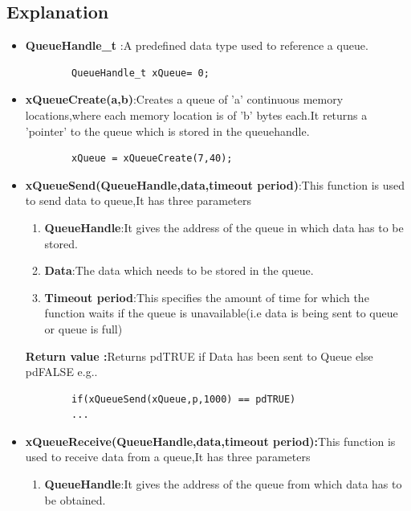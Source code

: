 \documentclass[11pt,a4paper]{article}
\begin{document}
	\subsection{Explanation}
	\begin{itemize}
		\item \textbf{QueueHandle\_t} :A predefined data type used to reference a queue.
		
		\begin{lstlisting}
		QueueHandle_t xQueue= 0;
		\end{lstlisting}	
		
		\item \textbf{xQueueCreate(a,b)}:Creates a queue of 'a' continuous memory locations,where each memory location is of 'b' bytes each.It returns a 'pointer' to the queue which is stored in the queuehandle.
		
		\begin{lstlisting}
		xQueue = xQueueCreate(7,40);
		\end{lstlisting}
		
		\item \textbf{xQueueSend(QueueHandle,data,timeout period)}:This function is used to send data to queue,It has three parameters
		
		\begin{enumerate}
			\item\textbf{QueueHandle}:It gives the address of the queue in which data has to be stored.
			
			\item\textbf{Data}:The data which needs to be stored in the queue.
			
			\item\textbf{Timeout period}:This specifies the amount of time for which the function waits if the queue is unavailable(i.e data is being sent to queue or queue is full) 
			\newline		
		\end{enumerate}
		
		\textbf{Return value :}Returns pdTRUE if Data has been sent to Queue else pdFALSE e.g..
		\begin{lstlisting}
		if(xQueueSend(xQueue,p,1000) == pdTRUE)
		...
		\end{lstlisting}
	\item \textbf{xQueueReceive(QueueHandle,data,timeout period):}This function is used to receive data from a queue,It has three parameters
	
	\begin{enumerate}
		\item\textbf{QueueHandle}:It gives the address of the queue from which data has to be obtained.
		

\end{enumerate}
\end{itemize}
\end{document}

